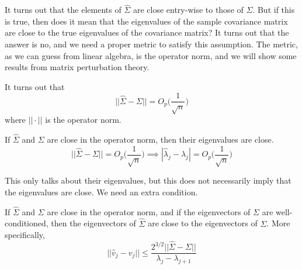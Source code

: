   It turns out that the elements of $\hat{\Sigma}$ are close entry-wise to those of $\Sigma$. But if this is true, then does it mean that the eigenvalues of the sample covariance matrix are close to the true eigenvalues of the covariance matrix? It turns out that the answer is no, and we need a proper metric to satisfy this assumption. The metric, as we can guess from linear algebra, is the operator norm, and we will show some results from matrix perturbation theory. 

  \begin{lemma}[]
    It turns out that 
    \begin{equation}
      ||\hat{\Sigma} - \Sigma|| = O_p \bigg( \frac{1}{\sqrt{n}} \bigg)
    \end{equation}
    where $|| \cdot ||$ is the operator norm. 
  \end{lemma}

  \begin{theorem}
    If $\hat{\Sigma}$ and $\Sigma$ are close in the operator norm, then their eigenvalues are close. 
    \begin{equation}
      ||\hat{\Sigma} - \Sigma|| = O_p \bigg( \frac{1}{\sqrt{n}} \bigg) \implies |\hat{\lambda}_j - \lambda_j| = O_p \bigg( \frac{1}{\sqrt{n}} \bigg) 
    \end{equation}
  \end{theorem}

  This only talks about their eigenvalues, but this does not necessarily imply that the eigenvalues are close. We need an extra condition. 

  \begin{theorem}
    If $\hat{\Sigma}$ and $\Sigma$ are close in the operator norm, and if the eigenvectors of $\Sigma$ are well-conditioned, then the eigenvectors of $\hat{\Sigma}$ are close to the eigenvectors of $\Sigma$. More specifically, 
    \begin{equation}
      ||\hat{v}_j - v_j|| \leq \frac{2^{3/2} ||\hat{\Sigma} - \Sigma||}{\lambda_j - \lambda_{j+1}}
    \end{equation}
  \end{theorem}

